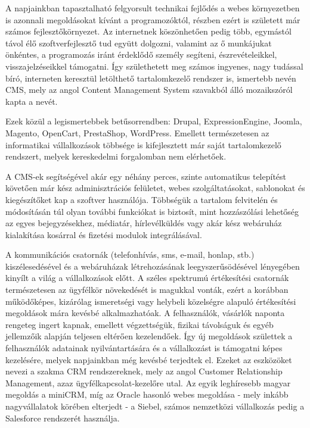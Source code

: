 \label{Chap:bevezetes}

A napjainkban tapasztalható felgyorsult technikai fejlődés a webes környezetben is azonnali megoldásokat kívánt a programozóktól, részben ezért is született már számos fejlesztőkörnyezet. Az internetnek köszönhetően pedig több, egymástól távol élő szoftverfejlesztő tud együtt dolgozni, valamint az ő munkájukat önkéntes, a programozás iránt érdeklődő személy segíteni, észrevételeikkel, visszajelzéseikkel támogatni. Így születhetett meg számos ingyenes, nagy tudással bíró, interneten keresztül letölthető tartalomkezelő rendszer is, ismertebb nevén CMS, mely az angol Content Management System szavakból álló mozaikszóról kapta a nevét.

Ezek közül a legismertebbek betűsorrendben: Drupal, ExpressionEngine, Joomla, Magento, OpenCart, PrestaShop, WordPress. Emellett természetesen az informatikai vállalkozások többsége is kifejlesztett már saját tartalomkezelő rendszert, melyek kereskedelmi forgalomban nem elérhetőek.

A CMS-ek segítségével akár egy néhány perces, szinte automatikus telepítést követően már kész adminisztrációs felületet, webes szolgáltatásokat, sablonokat és kiegészítőket kap a szoftver használója. Többségük a tartalom felvitelén és módosításán túl olyan további funkciókat is biztosít, mint hozzászólási lehetőség az egyes bejegyzésekhez, médiatár, hírlevélküldés vagy akár kész webáruház kialakítása kosárral és fizetési modulok integrálásával.

A kommunikációs csatornák (telefonhívás, sms, e-mail, honlap, stb.) kiszélesedésével és a webáruházak létrehozásának leegyszerűsödésével lényegében kinyílt a világ a vállalkozások előtt. A széles spektrumú értékesítési csatornák természetesen az ügyfélkör növekedését is magukkal vonták, ezért a korábban működőképes, kizárólag ismeretségi vagy helybeli közelségre alapuló értékesítési megoldások mára kevésbé alkalmazhatóak. A felhasználók, vásárlók naponta rengeteg ingert kapnak, emellett végzettségük, fizikai távolságuk és egyéb jellemzőik alapján teljesen eltérően kezelendőek. Így új megoldások születtek a felhasználók adatainak nyilvántartására és a vállalkozást is támogatni képes kezelésére, melyek napjainkban még kevésbé terjedtek el. Ezeket az eszközöket nevezi a szakma CRM rendszereknek, mely az angol Customer Relationship Management, azaz ügyfélkapcsolat-kezelőre utal. Az egyik leghíresebb magyar megoldás a miniCRM, míg az Oracle hasonló webes megoldása - mely inkább nagyvállalatok körében elterjedt - a Siebel, számos nemzetközi vállalkozás pedig a Salesforce rendszerét használja.

